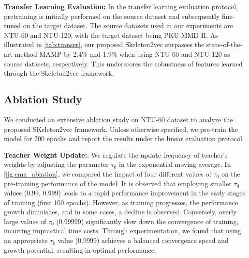 \noindent \textbf{Transfer Learning Evaluation:}
In the transfer learning evaluation protocol, pretraining is initially performed
on the source dataset and subsequently fine-tuned on the target dataset. The
source datasets used in our experiments are NTU-60 and NTU-120, with the target
dataset being PKU-MMD II. As illustrated in \cref{tab:transer}, our proposed
Skeleton2vec surpasses the state-of-the-art method MAMP by 2.4\% and 1.9\% when
using NTU-60 and NTU-120 as source datasets, respectively. This underscores the
robustness of features learned through the Skeleton2vec framework.

\subsection{Ablation Study}
We conducted an extensive ablation study on NTU-60 dataset to analyze the proposed
SKeleton2vec framework. Unless otherwise specified, we pre-train the model for 200
epochs and report the results under the linear evaluation protocol.

\noindent \textbf{Teacher Weight Update:}:
We regulate the update frequency of teacher's weights by adjusting the parameter
$\tau_{0}$ in the exponential moving average. In \cref{fig:ema_ablation}, we compared the
impact of four different values of $\tau_{0}$ on the pre-training performance of the model.
It is observed that employing smaller $\tau_{0}$ values (0.99, 0.999) leads to a rapid
performance improvement in the early stages of training (first 100 epochs). However,
as training progresses, the performance growth diminishes, and in some cases,
a decline is observed. Conversely, overly large values of $\tau_{0}$ (0.99999) significantly
slow down the convergence of training, incurring impractical time costs.
Through experimentation, we found that using an appropriate $\tau_{0}$ value (0.9999)
achieves a balanced convergence speed and growth potential,
resulting in optimal performance.




